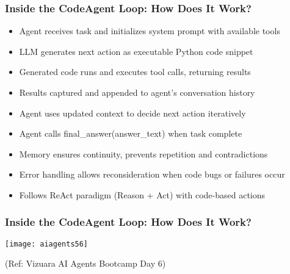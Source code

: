 \begin{frame}[fragile]\frametitle{Inside the CodeAgent Loop: How Does It Work?}


      \begin{itemize}
		\item Agent receives task and initializes system prompt with available tools
		\item LLM generates next action as executable Python code snippet
		\item Generated code runs and executes tool calls, returning results
		\item Results captured and appended to agent's conversation history
		\item Agent uses updated context to decide next action iteratively
		\item Agent calls final\_answer(answer\_text) when task complete
		\item Memory ensures continuity, prevents repetition and contradictions
		\item Error handling allows reconsideration when code bugs or failures occur
		\item Follows ReAct paradigm (Reason + Act) with code-based actions
	  \end{itemize}


\end{frame}

\begin{frame}[fragile]\frametitle{Inside the CodeAgent Loop: How Does It Work?}


		\begin{center}
		\texttt{[image: aiagents56]}
		
		{\tiny (Ref: Vizuara AI Agents Bootcamp Day 6)}

		\end{center}	

  

\end{frame}

